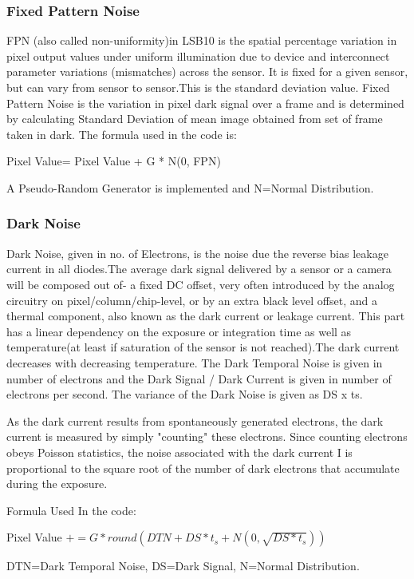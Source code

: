 \documentclass[../../main.tex]{subfiles}
\begin{document}
\subsubsection{Fixed Pattern Noise} %
FPN (also called non-uniformity)in LSB10 is the spatial percentage variation in pixel output values under uniform illumination due to device and interconnect parameter variations (mismatches) across the sensor. It is fixed for a given sensor, but can vary from sensor to sensor.This is the standard deviation value.
Fixed Pattern Noise is the variation in pixel dark signal over a frame and is determined by calculating Standard Deviation of mean image obtained from set of frame taken in dark.
The formula used in the code is:

Pixel Value= Pixel Value + G * N(0, FPN)

A Pseudo-Random Generator is implemented and N=Normal Distribution.


\subsubsection{Dark Noise} %
Dark Noise, given in no. of Electrons, is the noise due the reverse bias leakage current in
all diodes.The average dark signal delivered by a sensor or a camera will be composed out of- a fixed DC offset, very often introduced by the analog circuitry on pixel/column/chip-level, or by an
extra black level offset, and a thermal component, also known as the dark current or leakage current. This part has a linear dependency on the exposure or integration time as well as temperature(at least if saturation of the sensor is not reached).The dark current decreases with decreasing temperature.
The Dark Temporal Noise is given in number of electrons and the Dark Signal / Dark Current is
given in number of electrons per second. The variance of the Dark Noise is given as DS x ts.

As the dark current results from spontaneously generated electrons, the dark current is measured by simply "counting" these electrons. Since counting electrons obeys Poisson statistics, the noise associated with the dark current I is proportional to the square root of the number of dark electrons that accumulate during the exposure. 

Formula Used In the code:  

Pixel Value $+= G * round(DTN + DS * t_s + N(0,\sqrt{DS *t_s}))$

DTN=Dark Temporal Noise, DS=Dark Signal, N=Normal Distribution.
\end{document}
